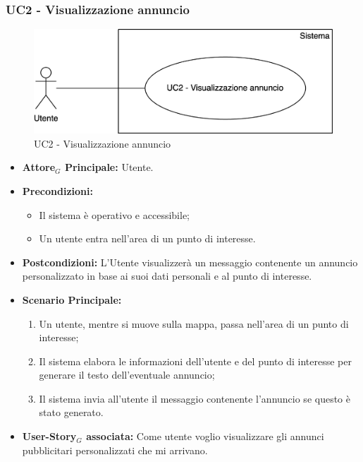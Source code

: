 \documentclass[11pt]{article}
\begin{document}
\begin{justify}

\subsubsection{\textbf{UC2 - Visualizzazione annuncio}}
\begin{figure}[H]
    \centering
    \includegraphics[width=0.7\linewidth]{UC2image.png}
    \caption{UC2 - Visualizzazione annuncio}
    \label{fig:UC2}
\end{figure}
\begin{itemize}
    \item \textbf{Attore$_G$ Principale:} Utente.
    \item \textbf{Precondizioni:} 
        \begin{itemize}
    	\item Il sistema è operativo e accessibile;
    	\item Un utente entra nell'area di un punto di interesse.
        \end{itemize}
    \item \textbf{Postcondizioni:} L'Utente visualizzerà un messaggio contenente un annuncio personalizzato in base ai suoi dati personali e al punto di interesse.
    \item \textbf{Scenario Principale:} 
        \begin{enumerate}
            \item Un utente, mentre si muove sulla mappa, passa nell'area di un punto di interesse;
            \item Il sistema elabora le informazioni dell'utente e del punto di interesse per generare il testo dell'eventuale annuncio;
            \item Il sistema invia all'utente il messaggio contenente l'annuncio se questo è stato generato.
        \end{enumerate}
    \item \textbf{User-Story$_G$ associata:} Come utente voglio visualizzare gli annunci pubblicitari personalizzati che mi arrivano.
\end{itemize}

\end{justify}
\end{document}
